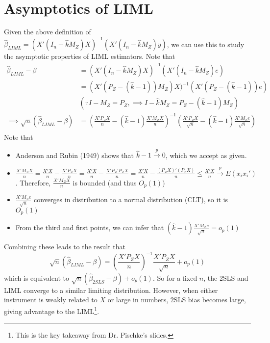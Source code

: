 \section{Asymptotics of LIML}
Given the above definition of $\hat{\beta}_{LIML}=(X'(I_n-\hat{k}M_Z)X)^{-1}(X'(I_n-\hat{k}M_Z)y)$, we can use this to study the asymptotic properties of LIML estimators. Note that
\[
\begin{aligned}
\hat{\beta}_{LIML}-\beta &= (X'(I_n-\hat{k}M_Z)X)^{-1}(X'(I_n-\hat{k}M_Z)e)\\
& =(X'(P_Z-(\hat{k}-1))M_Z)X)^{-1}(X'(P_Z-(\hat{k}-1))e) \\
& (\because I-M_Z=P_Z, \implies I-\hat{k}M_Z=P_Z-(\hat{k}-1)M_Z)\\
 \implies \sqrt{n}(\hat{\beta}_{LIML}-\beta)&=\left(\frac{X'P_ZX}{n}-(\hat{k}-1)\frac{X'M_ZX}{n}\right)^{-1}\left(\frac{X'P_ZX}{\sqrt{n}}-(\hat{k}-1)\frac{X'M_Ze}{\sqrt{n}}\right)\\
\end{aligned}
\]
Note that
\begin{itemize}
\item Anderson and Rubin (1949) shows that $\hat{k}-1\xrightarrow{p}0$, which we accept as given. 
\item $\frac{X'M_ZX}{n}=\frac{X'X}{n}-\frac{X'P_ZX}{n}=\frac{X'X}{n}-\frac{X'P_Z'P_ZX}{n}=\frac{X'X}{n}-\frac{(P_ZX)'(P_ZX)}{n}\leq\frac{X'X}{n}\xrightarrow{p}E(x_ix_i')$. Therefore, $\frac{X'M_ZX}{n}$ is bounded (and thus $O_p(1)$)
\item $\frac{X'M_Ze}{\sqrt{n}}$ converges in distribution to a normal distribution (CLT), so it is $O_p(1)$
\item From the third and first points, we can infer that $(\hat{k}-1)\frac{X'M_Ze}{\sqrt{n}}=o_p(1)$
\end{itemize}\par
Combining these leads to the result that 
\[
 \sqrt{n}(\hat{\beta}_{LIML}-\beta) =\left(\frac{X'P_ZX}{n}\right)^{-1}\frac{X'P_ZX}{\sqrt{n}} +o_p(1)
\]
which is equivalent to $ \sqrt{n}(\hat{\beta}_{2SLS}-\beta) +o_p(1)$. So for a fixed $n$, the 2SLS and LIML converge to a similar limiting distribution. However, when either instrument is weakly related to $X$ or large in numbers, 2SLS bias becomes large, giving advantage to the LIML\footnote{This is the key takeaway from Dr. Pischke's slides. }.
